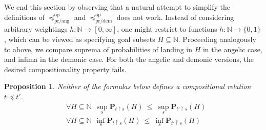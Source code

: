 \documentclass[a4paper,UKenglish]{lipics-v2018}
\newcommand{\Basicleq}{\preccurlyeq}
\newcommand{\prang}{\text{pr/ang}}
\newcommand{\prdem}{\text{pr/dem}}
\newcommand{\Op}{\text{op}}
\theoremstyle{plain}
\newtheorem{proposition}[theorem]{Proposition}
\begin{document}
We end this section by observing that a natural attempt to simplify  the definitions of 
 $\Basicleq^\Op_\prang$ and $\Basicleq^\Op_\prdem$ does not work. Instead of considering arbitrary weightings
 $h \colon \mathbb{N} \to [0,\infty]$, one might restrict to  
 functions $h \colon \mathbb{N} \to \{0,1\}$, which can be viewed as specifying goal subsets $H \subseteq \mathbb{N}$.
 Proceeding analogously to above, we compare suprema of probabilities of landing in $H$ in the angelic case, and infima in the demonic case. For both the angelic and demonic versions, the desired compositionality property fails.
\begin{proposition}
Neither of the formulas below defines a compositional relation $t \Basicleq t'$. %
 \begin{align*}
 & \forall H \subseteq \mathbb{N}  ~~ \sup_s  \mathbf{P}_{t\restriction s} (H)~ \leq~ \sup_s \mathbf{P}_{t'\restriction s} (H)
\\
 & \forall H \subseteq \mathbb{N}  ~~ \inf_s  \mathbf{P}_{t\restriction s} (H)~ \leq~ \inf_s \mathbf{P}_{t'\restriction s} (H)
\end{align*}
\end{proposition}


 
 




\end{document}
